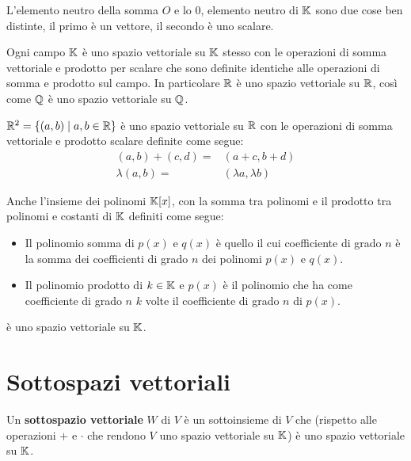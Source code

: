 \begin{observation}
	L'elemento neutro della somma $O$ e lo $0$, elemento neutro di $\mathbb{K}$ sono due cose ben distinte, il primo è
	un vettore, il secondo è uno scalare.
\end{observation}

\begin{example}
	Ogni campo $\mathbb{K}$ è uno spazio vettoriale su $\mathbb{K}$ stesso con le operazioni di somma vettoriale e prodotto per
	scalare che sono definite identiche alle operazioni di somma e prodotto sul campo. In particolare $\mathbb{R}$ è uno
	spazio vettoriale su $\mathbb{R}$, così come $\mathbb{Q}$ è uno spazio vettoriale su $\mathbb{Q}$.
\end{example}

\begin{example}
	$\mathbb{R}^2 = \{(a, b) \mid a,b \in \mathbb{R}\}$ è uno spazio vettoriale su $\mathbb{R}$ con le operazioni di somma vettoriale e
	prodotto scalare definite come segue:
	\begin{align*}
		(a,b) + (c,d) =  & (a + c, b + d)         \\
		\lambda (a, b) = & (\lambda a, \lambda b)
	\end{align*}
\end{example}

\begin{example}
	Anche l'insieme dei polinomi $\mathbb{K}[x]$, con la somma tra polinomi e il prodotto tra polinomi e costanti di
	$\mathbb{K}$ definiti come segue:
	\begin{itemize}
		\item Il polinomio somma di $p(x)$ e $q(x)$ è quello il cui coefficiente di grado $n$ è la somma dei
		      coefficienti di grado $n$ dei polinomi $p(x)$ e $q(x)$.
		\item Il polinomio prodotto di $k \in \mathbb{K}$ e $p(x)$ è il polinomio che ha come coefficiente di
		      grado $n$ $k$ volte il coefficiente di grado $n$ di $p(x)$.
	\end{itemize}
	è uno spazio vettoriale su $\mathbb{K}$.
\end{example}

\section{Sottospazi vettoriali}

\begin{definition}
	Un \textbf{sottospazio vettoriale} $W$ di $V$ è un sottoinsieme di $V$ che (rispetto alle operazioni $+$
	e $\cdot$ che rendono $V$ uno spazio vettoriale su $\mathbb{K}$) è uno spazio vettoriale su $\mathbb{K}$.
\end{definition}

